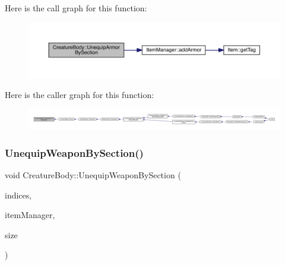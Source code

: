 Here is the call graph for this function\+:
\nopagebreak
\begin{figure}[H]
\begin{center}
\leavevmode
\includegraphics[width=350pt]{da/d7d/class_creature_body_aa923b5ba453a19b651af7290d568a4fc_cgraph}
\end{center}
\end{figure}
Here is the caller graph for this function\+:
\nopagebreak
\begin{figure}[H]
\begin{center}
\leavevmode
\includegraphics[width=350pt]{da/d7d/class_creature_body_aa923b5ba453a19b651af7290d568a4fc_icgraph}
\end{center}
\end{figure}
\mbox{\label{class_creature_body_a4cd14d7e1ed54d8beeb853a99ff0516c}} 
\subsubsection{\texorpdfstring{Unequip\+Weapon\+By\+Section()}{UnequipWeaponBySection()}}
{\footnotesize\ttfamily void Creature\+Body\+::\+Unequip\+Weapon\+By\+Section (\begin{DoxyParamCaption}\item[{std\+::vector$<$ int $>$ \&}]{indices,  }\item[{\mbox{\hyperlink{class_item_manager}{Item\+Manager}} \&}]{item\+Manager,  }\item[{\mbox{\hyperlink{_weapon_8hpp_a160076f6c574c69cd1ce2b3f42cf3755}{En\+Weapon\+Size}}}]{size }\end{DoxyParamCaption})}

